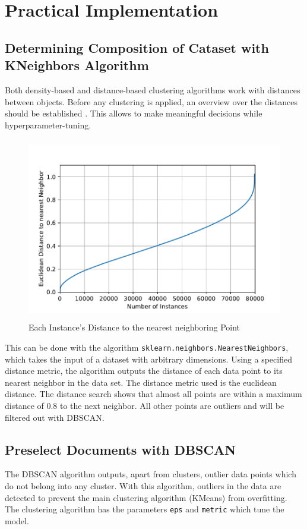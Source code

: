 \section{Practical Implementation}

\subsection{Determining Composition of Cataset with KNeighbors Algorithm}


Both density-based and distance-based clustering algorithms work with distances between objects. Before any clustering is applied, an overview over the distances should be established \cite{maklinDBSCANPythonExample2022a}. This allows to make meaningful decisions while hyperparameter-tuning.

 \begin{figure}[!h]
	\centering
	\includegraphics[height=8cm]{Bilder/models/kneighbors.pdf}
	\caption{Each Instance's Distance to the nearest neighboring Point}
	\label{fig:dbscan-plot}
\end{figure}

This can be done with the algorithm \lstinline|sklearn.neighbors.NearestNeighbors|, which takes the input of a dataset with arbitrary dimensions. Using a specified distance metric, the algorithm outputs the distance of each data point to its nearest neighbor in the data set. The distance metric used is the euclidean distance.
The distance search shows that almost all points are within a maximum distance of 0.8 to the next neighbor. All other points are outliers and will be filtered out with \ac{DBSCAN}.



\subsection{Preselect Documents with \ac{DBSCAN}}
The \ac{DBSCAN} algorithm outputs, apart from clusters, outlier data points which do not belong into any cluster. With this algorithm, outliers in the data are detected to prevent the main clustering algorithm (KMeans) from overfitting. 
The clustering algorithm has the parameters \lstinline|eps| and \lstinline|metric| which tune the model.

